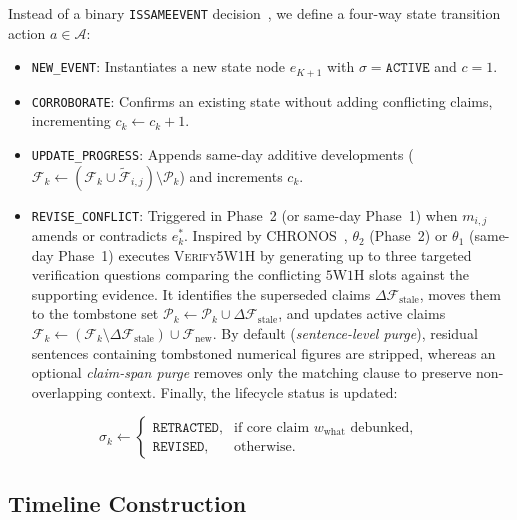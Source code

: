 \documentclass[journal]{IEEEtran}
\begin{document}
Instead of a binary \texttt{ISSAMEEVENT} decision~\cite{hu2024moments}, we define a four-way state transition action $a \in \mathcal{A}$:
\begin{itemize}
    \item \texttt{NEW\_EVENT}: Instantiates a new state node $e_{K+1}$ with $\sigma = \texttt{ACTIVE}$ and $c = 1$.
    \item \texttt{CORROBORATE}: Confirms an existing state without adding conflicting claims, incrementing $c_k \leftarrow c_k + 1$.
    \item \texttt{UPDATE\_PROGRESS}: Appends same-day additive developments ($\mathcal{F}_k \leftarrow (\mathcal{F}_k \cup \tilde{\mathcal{F}}_{i,j}) \setminus \mathcal{P}_k$) and increments $c_k$.
    \item \texttt{REVISE\_CONFLICT}: Triggered in Phase~2 (or same-day Phase~1) when $m_{i,j}$ amends or contradicts $e_k^*$. Inspired by CHRONOS~\cite{wu2025unfolding}, $\theta_2$ (Phase~2) or $\theta_1$ (same-day Phase~1) executes \textsc{Verify5W1H} by generating up to three targeted verification questions comparing the conflicting $5\text{W}1\text{H}$ slots against the supporting evidence. It identifies the superseded claims $\Delta\mathcal{F}_{\text{stale}}$, moves them to the tombstone set $\mathcal{P}_k \leftarrow \mathcal{P}_k \cup \Delta\mathcal{F}_{\text{stale}}$, and updates active claims $\mathcal{F}_k \leftarrow (\mathcal{F}_k \setminus \Delta\mathcal{F}_{\text{stale}}) \cup \mathcal{F}_{\text{new}}$. By default (\textit{sentence-level purge}), residual sentences containing tombstoned numerical figures are stripped, whereas an optional \textit{claim-span purge} removes only the matching clause to preserve non-overlapping context. Finally, the lifecycle status is updated:
\end{itemize}
\begin{equation}
\sigma_k \leftarrow \begin{cases}
\texttt{RETRACTED}, & \text{if core claim } w_{\text{what}} \text{ debunked}, \\
\texttt{REVISED}, & \text{otherwise}.
\end{cases}
\label{eq:status_update}
\end{equation}

\subsection{Timeline Construction}
\label{subsec:timeline_construction}
\end{document}
